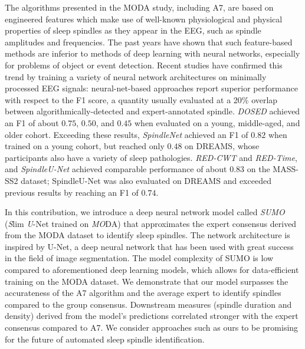 \documentclass[fleqn,twocolumn,10pt]{wlscirep}
\begin{document}
The algorithms presented in the MODA study, including A7, are based on engineered
features which make use of
well-known physiological and physical properties of sleep spindles as they
appear in the EEG, such as spindle amplitudes and frequencies\cite{Schimicek1994,Moelle2002,Ferrarelli2007,Wamsley2012,
Martin2013,Parekh2015,Lacourse2019}.
The past years have shown that such feature-based methods are inferior to
methods of deep learning with neural networks, especially for problems of
object or event detection\cite{Schmidhuber2015, LeCun2015, Goodfellow2016}.
Recent studies have confirmed this trend by training a variety of neural
network architectures on minimally processed EEG signals: neural-net-based
approaches report superior performance with respect to the F1 score,
a quantity usually evaluated at a 20\% overlap between algorithmically-detected
and expert-annotated spindle.
\textit{DOSED}\cite{Chambon2019} achieved an F1 of about $0.75$, $0.50$, and
$0.45$ when evaluated on a young, middle-aged, and older cohort.
Exceeding these results, \textit{SpindleNet}\cite{Kulkarni2019} achieved an F1
of $0.82$ when trained on a young cohort, but reached only $0.48$ on
DREAMS, whose participants also have a variety of sleep pathologies.
\textit{RED-CWT} and \textit{RED-Time}\cite{Tapia2020}, and
\textit{SpindleU-Net}\cite{You2021} achieved comparable performance of about
$0.83$ on the MASS-SS2 dataset; SpindleU-Net was also evaluated on DREAMS and
exceeded previous results by reaching an F1 of $0.74$.

In this contribution, we introduce a deep neural network model called
\emph{SUMO}\cite{Kaulen2022a} (\emph{S}lim \emph{U}-Net trained on \emph{MO}DA) that approximates the expert consensus derived from the MODA
dataset to identify sleep spindles.  The network architecture is inspired by
U-Net\cite{Ronneberger2015}, a deep neural network that has been used with
great success in the field of image segmentation\cite{Siddique2021}.  The model
complexity of SUMO is low compared to aforementioned deep learning models, which
allows for data-efficient training on the MODA dataset.  We demonstrate that
our model surpasses the accurateness of the A7 algorithm and the average expert
to identify spindles compared to the group consensus.  Downstream measures
(spindle duration and density) derived from the model's predictions correlated
stronger with the expert consensus compared to A7.  We consider approaches such
as ours to be promising for the future of automated sleep spindle
identification.
 
\end{document}
